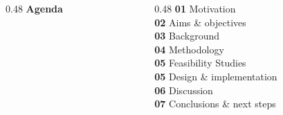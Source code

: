 
\begingroup
	\begin{frame}
		\begin{columns}[T]
			\begin{column}{0.48\linewidth}
				\HUGE\textbf{Agenda}
			\end{column}
			\begin{column}{0.48\linewidth}
				\textbf{01} Motivation\\
				\textbf{02} Aims \& objectives\\
				\textbf{03} Background\\
				\textbf{04} Methodology\\
                \textbf{05} Feasibility Studies\\
				\textbf{05} Design \& implementation\\
				\textbf{06} Discussion\\
				\textbf{07} Conclusions \& next steps
			\end{column}
		\end{columns}
	\end{frame}
\endgroup
